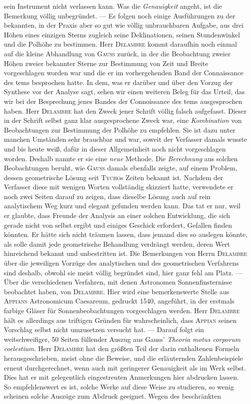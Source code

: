 sein Instrument nicht verlassen kann. Was die \emph{Genauigkeit} angeht, ist die Bemerkung völlig unbegründet. --- Es folgen noch einige Ausführungen zu der bekannten, in der Praxis aber so gut wie völlig unbrauchbaren Aufgabe, aus drei Höhen eines einzigen Sterns zugleich seine Deklinationen, seinen Stundenwinkel und die Polhöhe zu bestimmen. Herr \textsc{Delambre} kommt daraufhin noch einmal auf die kleine Abhandlung von \textsc{Gauss} zurück, in der die Beobachtung zweier Höhen zweier bekannter Sterne zur Bestimmung von Zeit und Breite vorgeschlagen worden war und die er im vorhergehenden Band der Connaissance des tems besprochen hatte. In dem, was er darüber und über den Vorzug der Synthese vor der Analyse sagt, sehen wir einen weiteren Beleg für das Urteil, das wir bei der Besprechung jenes Bandes der Connoissance des tems ausgesprochen haben. Herr \textsc{Delambre} hat den Zweck jener Schrift völlig falsch aufgefasst. Dieser in der Schrift selbst ganz klar ausgesprochene Zweck war, eine \emph{Kombination} von Beobachtungen zur Bestimmung der Polhöhe zu empfehlen. Sie ist dazu unter manchen Umständen sehr brauchbar und war, soweit der Verfasser damals wusste und bis heute weiß, dafür in dieser Allgemeinheit noch nicht vorgeschlagen worden. Deshalb nannte er sie eine \emph{neue} Methode. Die \emph{Berechnung} aus solchen Beobachtungen beruht, wie \textsc{Gauss} damals ebenfalls zeigte, auf einem Problem, dessen geometrische Lösung seit \textsc{Tycho}s Zeiten bekannt ist. Nachdem der Verfasser diese mit wenigen Worten vollständig skizziert hatte, verwendete er noch zwei Seiten darauf zu zeigen, dass dieselbe Lösung auch auf rein analytischem Weg kurz und elegant gefunden werden kann. Das tat er nur, weil er glaubte, dass Freunde der Analysis an einer solchen Entwicklung, die sich gerade nicht von selbst ergibt und einiges Geschick erfordert, Gefallen finden könnten. Er hätte sich nicht träumen lassen, dass jemand dies so auslegen könnte, als solle damit jede geometrische Behandlung verdrängt werden, deren Wert hinreichend bekannt und unbestritten ist. Die Bemerkungen von Herrn \textsc{Delambre} über die jeweiligen Vorzüge des analytischen und des geometrischen Verfahrens sind deshalb, obwohl sie meist völlig begründet sind, hier ganz fehl am Platz. --- Über die verschiedenen Verfahren, mit denen Astronomen Sonnenfinsternisse beobachtet haben, von \textsc{Delambre}. Hier wird eine bemerkenswerte Stelle aus \textsc{Appians} Astronomicum Caesareum, gedruckt 1540, angeführt, in der erstmals farbige Gläser für Sonnenbeobachtungen vorgeschlagen werden. Herr \textsc{Delambre} hält es allerdings aus triftigen Gründen für wahrscheinlich, dass \textsc{Appian} seinen Vorschlag selbst nicht umzusetzen versucht hat. --- Darauf folgt ein weitschweifiger, 50 Seiten füllender Auszug aus Gauss' \emph{Theoria motus corporum coelestium}. Herr \textsc{Delambre} hat den größten Teil der darin enthaltenen Formeln herausgeschrieben, meist ohne die Beweise, und die erläuternden Zahlenbeispiele erneut durchgerechnet, wenn auch mit geringerer Genauigkeit als im Werk selbst. Dies hat er mit gelegentlich eingestreuten Anmerkungen hier abdrucken lassen. So empfehlenswert es ist, solche Werke auf diese Weise zu studieren, so wenig scheinen solche Auszüge zum Abdruck geeignet. Wegen des beschränkten 